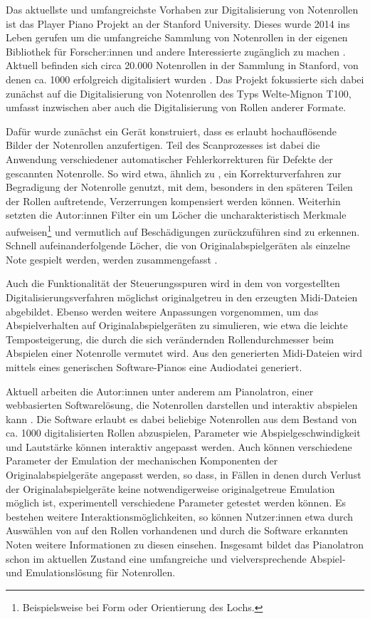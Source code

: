 Das aktuellste und umfangreichste Vorhaben zur Digitalisierung von Notenrollen ist das Player Piano Projekt an der Stanford University.
Dieses wurde 2014 ins Leben gerufen um die umfangreiche Sammlung von Notenrollen in der eigenen Bibliothek für Forscher:innen und andere Interessierte zugänglich zu machen \autocite[]{shi_2019}.
Aktuell befinden sich circa 20.000 Notenrollen in der Sammlung in Stanford, von denen ca. 1000 erfolgreich digitalisiert wurden \autocite[]{broadwell_2022}.
Das Projekt fokussierte sich dabei zunächst auf die Digitalisierung von Notenrollen des Typs Welte-Mignon T100, umfasst inzwischen aber auch die Digitalisierung von Rollen anderer Formate.

Dafür wurde zunächst ein Gerät konstruiert, dass es erlaubt hochauflösende Bilder der Notenrollen anzufertigen.
Teil des Scanprozesses ist dabei die Anwendung verschiedener automatischer Fehlerkorrekturen für Defekte der gescannten Notenrolle.
So wird etwa, ähnlich zu \textcite[]{zoltan_1994}, ein Korrekturverfahren zur Begradigung der Notenrolle genutzt, mit dem, besonders in den späteren Teilen der Rollen auftretende, Verzerrungen kompensiert werden können.
Weiterhin setzten die Autor:innen Filter ein um Löcher die uncharakteristisch Merkmale aufweisen\footnote{Beispielsweise bei Form oder Orientierung des Lochs.} und vermutlich auf Beschädigungen zurückzuführen sind zu erkennen.
Schnell aufeinanderfolgende Löcher, die von Originalabspielgeräten als einzelne Note gespielt werden, werden zusammengefasst \parencite[519-520]{shi_2019}.

Auch die Funktionalität der Steuerungsspuren wird in dem von \textcite[521-522]{shi_2019} vorgestellten Digitalisierungsverfahren möglichst originalgetreu in den erzeugten Midi-Dateien abgebildet.
Ebenso werden weitere Anpassungen vorgenommen, um das Abspielverhalten auf Originalabspielgeräten zu simulieren, wie etwa die leichte Temposteigerung, die durch die sich verändernden Rollendurchmesser beim Abspielen einer Notenrolle vermutet wird.
Aus den generierten Midi-Dateien wird mittels eines generischen Software-Pianos eine Audiodatei generiert.

Aktuell arbeiten die Autor:innen unter anderem am Pianolatron, einer webbasierten Softwarelösung, die Notenrollen darstellen und interaktiv abspielen kann \parencite[]{vijoy_2022}.
Die Software erlaubt es dabei beliebige Notenrollen aus dem Bestand von ca. 1000 digitalisierten Rollen abzuspielen, Parameter wie Abspielgeschwindigkeit und Lautstärke können interaktiv angepasst werden.
Auch können verschiedene Parameter der Emulation der mechanischen Komponenten der Originalabspielgeräte angepasst werden, so dass, in Fällen in denen durch Verlust der Originalabspielgeräte keine notwendigerweise originalgetreue Emulation möglich ist, experimentell verschiedene Parameter getestet werden können.
Es bestehen weitere Interaktionsmöglichkeiten, so können Nutzer:innen etwa durch Auswählen von auf den Rollen vorhandenen und durch die Software erkannten Noten weitere Informationen zu diesen einsehen.
Insgesamt bildet das Pianolatron schon im aktuellen Zustand eine umfangreiche und vielversprechende Abspiel- und Emulationslösung für Notenrollen.

